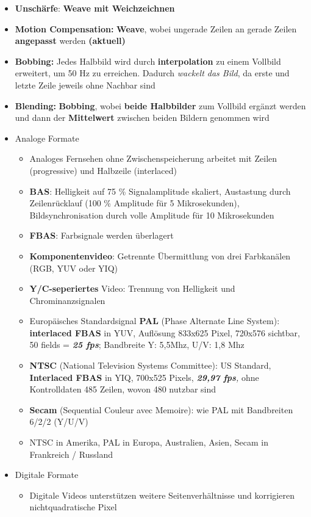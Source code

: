 \documentclass[12pt,landscape]{article}
\begin{document}
\begin{multicols}{3}
\begin{itemize}
\item \textbf{Unschärfe}: \textbf{Weave mit Weichzeichnen}
\item \textbf{Motion Compensation:} \textbf{Weave}, wobei ungerade Zeilen an gerade Zeilen \textbf{angepasst} werden \textbf{(aktuell)}
\item \textbf{Bobbing: }Jedes Halbbild wird durch \textbf{interpolation} zu einem Vollbild erweitert, um 50 Hz zu erreichen. Dadurch \textit{wackelt das Bild}, da erste und letzte Zeile jeweils ohne Nachbar sind
\item \textbf{Blending:} \textbf{Bobbing}, wobei \textbf{beide Halbbilder} zum Vollbild ergänzt werden und dann der \textbf{Mittelwert} zwischen beiden Bildern genommen wird
\item Analoge Formate
\begin{itemize}
    \item Analoges Fernsehen ohne Zwischenspeicherung arbeitet mit Zeilen (progressive) und Halbzeile (interlaced) 
    \item \textbf{BAS}: Helligkeit auf 75 \% Signalamplitude skaliert, Austastung durch Zeilenrücklauf (100 \% Amplitude für 5 Mikrosekunden), Bildsynchronisation durch volle Amplitude für 10 Mikrosekunden
    \item \textbf{FBAS}: Farbsignale werden überlagert
    \item \textbf{Komponentenvideo}: Getrennte Übermittlung von drei Farbkanälen (RGB, YUV oder YIQ)
    \item \textbf{Y/C-seperiertes} Video: Trennung von Helligkeit und Chrominanzsignalen
    \item Europäisches Standardsignal \textbf{PAL }(Phase Alternate Line System): \textbf{interlaced FBAS} in YUV, Auflösung 833x625 Pixel, 720x576 sichtbar, 50 fields = \textbf{\textit{25 fps}}; Bandbreite Y: 5,5Mhz, U/V: 1,8 Mhz
    \item \textbf{NTSC }(National Television Systems Committee): US Standard, \textbf{Interlaced FBAS} in YIQ, 700x525 Pixels, \textit{\textbf{29,97 fps},} ohne Kontrolldaten 485 Zeilen, wovon 480 nutzbar sind
    \item \textbf{Secam }(Sequential Couleur avec Memoire): wie PAL mit Bandbreiten 6/2/2 (Y/U/V)
    \item NTSC in Amerika, PAL in Europa, Australien, Asien, Secam in Frankreich / Russland
\end{itemize}
\item Digitale Formate
\begin{itemize}
    \item Digitale Videos unterstützen weitere Seitenverhältnisse und korrigieren nichtquadratische Pixel

\end{itemize}
\end{itemize}
\end{multicols}
\end{document}
